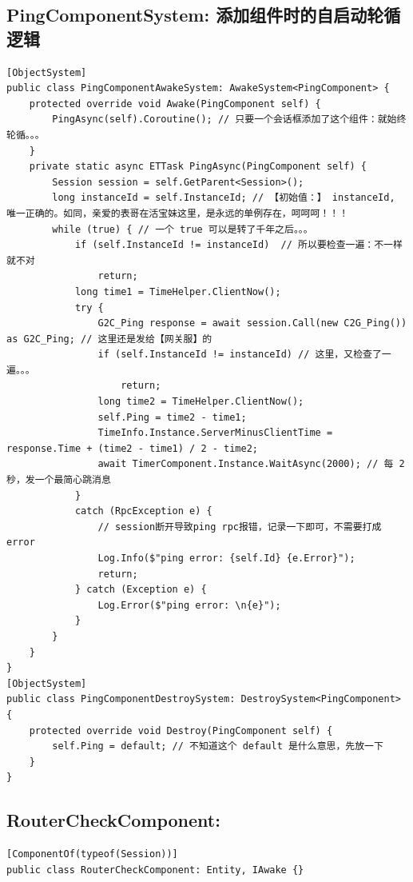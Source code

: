 \documentclass[9pt, b5paper]{article}
\begin{document}
\subsection{PingComponentSystem: 添加组件时的自启动轮循逻辑}
\label{sec:orgb8b6e3c}
\begin{verbatim}
[ObjectSystem]
public class PingComponentAwakeSystem: AwakeSystem<PingComponent> {
    protected override void Awake(PingComponent self) {
        PingAsync(self).Coroutine(); // 只要一个会话框添加了这个组件：就始终轮循。。。
    }
    private static async ETTask PingAsync(PingComponent self) {
        Session session = self.GetParent<Session>();
        long instanceId = self.InstanceId; // 【初始值：】 instanceId, 唯一正确的。如同，亲爱的表哥在活宝妹这里，是永远的单例存在，呵呵呵！！！
        while (true) { // 一个 true 可以是转了千年之后。。。
            if (self.InstanceId != instanceId)  // 所以要检查一遍：不一样就不对
                return;
            long time1 = TimeHelper.ClientNow();
            try {
                G2C_Ping response = await session.Call(new C2G_Ping()) as G2C_Ping; // 这里还是发给【网关服】的
                if (self.InstanceId != instanceId) // 这里，又检查了一遍。。。 
                    return;
                long time2 = TimeHelper.ClientNow();
                self.Ping = time2 - time1;
                TimeInfo.Instance.ServerMinusClientTime = response.Time + (time2 - time1) / 2 - time2;
                await TimerComponent.Instance.WaitAsync(2000); // 每 2 秒，发一个最简心跳消息
            }
            catch (RpcException e) {
                // session断开导致ping rpc报错，记录一下即可，不需要打成error
                Log.Info($"ping error: {self.Id} {e.Error}");
                return;
            } catch (Exception e) {
                Log.Error($"ping error: \n{e}");
            }
        }
    }
}
[ObjectSystem]
public class PingComponentDestroySystem: DestroySystem<PingComponent> {
    protected override void Destroy(PingComponent self) {
        self.Ping = default; // 不知道这个 default 是什么意思，先放一下
    }
}
\end{verbatim}
\subsection{RouterCheckComponent:}
\label{sec:org2c95074}
\begin{verbatim}
[ComponentOf(typeof(Session))]
public class RouterCheckComponent: Entity, IAwake {}
\end{verbatim}
\end{document}

